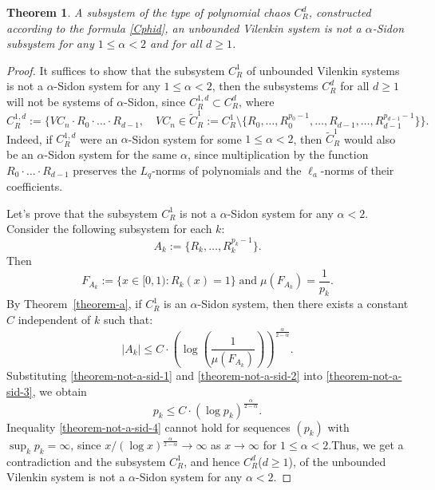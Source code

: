 \documentclass[12pt]{article}
\newtheorem{theorem}{Theorem}  %
\begin{document}
	\begin{theorem} \label{theorem-not-a-sid}
		A subsystem of the type of polynomial chaos $C^d_R$, constructed according to the formula \eqref{Cphid}, an unbounded Vilenkin system is not a $\alpha$-Sidon subsystem for any $1\le\alpha<2$ and for all $d\ge 1$.
	\end{theorem}
	\begin{proof}
		It suffices to show that the subsystem $C_R^1$ of unbounded Vilenkin systems is not a $\alpha$-Sidon system for any $1\le\alpha<2$, then the subsystems $C_R^d$ for all $d\ge1$ will not be systems of $\alpha$-Sidon, since $C_R^{1,d} \subset C_R^d$, where 
		\[
		C_R^{1,d} := \{VC_n \cdot R_0\cdot \ldots \cdot R_{d-1}, \quad VC_n \in \widetilde{C}_R^1 := C_R^1 \setminus \{R_0,\ldots, R_0^{p_0-1}, \ldots, R_{d-1},\ldots, R_{d-1}^{p_{d-1}-1}\}\}.
		\]  
Indeed, if $C_R^{1,d}$ were an $\alpha$-Sidon system for some $1 \le \alpha < 2$, then $\widetilde{C}_R^1$ would also be an $\alpha$-Sidon system for the same $\alpha$, since multiplication by the function $R_0 \cdot \ldots \cdot R_{d-1}$ preserves the $L_q$-norms of polynomials and the $\ell_a$-norms of their coefficients. 
		
Let's prove that the subsystem $C_R^1$ is not a $\alpha$-Sidon system for any $\alpha<2$. Consider the following subsystem for each $k$:
		\begin{equation} \label{theorem-not-a-sid-1}
			A_k := \{R_k, \ldots, R_k^{p_k-1}\}.
		\end{equation}
		Then 
		\begin{equation} \label{theorem-not-a-sid-2}
			F_{A_k}:= \{x\in [0,1)\colon R_k(x)=1\} \; \text{and} \; \mu(F_{A_k}) = \frac{1}{p_k}.
		\end{equation}
By Theorem~\ref{theorem-a}, if $C^1_R$ is an $\alpha$-Sidon system, then there exists a constant $C$ independent of $k$ such that:
		\begin{equation} \label{theorem-not-a-sid-3}
		|A_k|\le C \cdot \left(\log\left(\frac{1}{\mu(F_{A_k})}\right)\right)^{\frac{\alpha}{2-\alpha}}.
	    \end{equation}
		Substituting \eqref{theorem-not-a-sid-1} and \eqref{theorem-not-a-sid-2} into \eqref{theorem-not-a-sid-3}, we obtain
		\begin{equation} \label{theorem-not-a-sid-4}
			p_k\le C \cdot \left(\log p_k\right)^{\frac{\alpha}{2-\alpha}}.
		\end{equation}
		Inequality \eqref{theorem-not-a-sid-4} cannot hold for sequences $(p_k)$ with $\sup_k p_k = \infty$, since $x / (\log x)^{\frac{\alpha}{2-\alpha}} \to \infty$ as $x \to \infty$ for $1 \le \alpha < 2$.Thus, we get a contradiction and the subsystem $C^1_R$, and hence $C^d_R$($d\ge 1$), of the unbounded Vilenkin system is not a $\alpha$-Sidon system for any $\alpha<2$.
	\end{proof}
	
\end{document}
